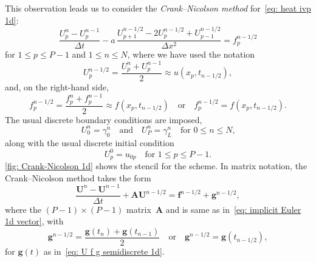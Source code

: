 This observation leads us to consider the \emph{Crank--Nicolson method} 
for~\eqref{eq: heat ivp 1d}:
\begin{equation}\label{eq: Crank-Nicolson 1d}
\frac{U^n_p-U^{n-1}_p}{\Delta t}
    -a\,\frac{U^{n-1/2}_{p+1}-2U^{n-1/2}_p+U^{n-1/2}_{p-1}}{\Delta x^2}
    =f^{n-1/2}_p
\end{equation}
for $1\le p\le P-1$ and $1\le n\le N$, where we have used the notation
\[
U^{n-1/2}_p=\frac{U^n_p+U^{n-1}_p}{2}\approx u(x_p,t_{n-1/2}),
\]
and, on the right-hand side, 
\[
f^{n-1/2}_p=\frac{f^n_p+f^{n-1}_p}{2}\approx f(x_p,t_{n-1/2})
\quad\text{or}\quad
f^{n-1/2}_p=f(x_p,t_{n-1/2}).
\]
The usual discrete boundary conditions are imposed,
\[
U^n_0=\gamma_0^n\quad\text{and}\quad
U^n_P=\gamma_L^n\quad\text{for $0\le n\le N$,}
\]
along with the usual discrete initial condition
\[
U^0_p=u_{0p}\quad\text{for $1\le p\le P-1$.}
\]
\cref{fig: Crank-Nicolson 1d} shows the stencil for the scheme.
In matrix notation, the Crank--Nicolson method takes the form
\begin{equation}\label{eq: Crank-Nicolson matrix}
\frac{\boldsymbol{U}^n-\boldsymbol{U}^{n-1}}{\Delta t}
    +\boldsymbol{A}\boldsymbol{U}^{n-1/2}=\boldsymbol{f}^{n-1/2}
    +\boldsymbol{g}^{n-1/2},
\end{equation}
where the $(P-1)\times(P-1)$ matrix~$\boldsymbol{A}$ and 
is same as in~\eqref{eq: implicit Euler 1d vector}, with 
\[
\boldsymbol{g}^{n-1/2}=\frac{\boldsymbol{g}(t_n)+\boldsymbol{g}(t_{n-1})}{2}
\quad\text{or}\quad
\boldsymbol{g}^{n-1/2}=\boldsymbol{g}(t_{n-1/2}),
\]
for $\boldsymbol{g}(t)$ as in~\eqref{eq: U f g semidiscrete 1d}.

